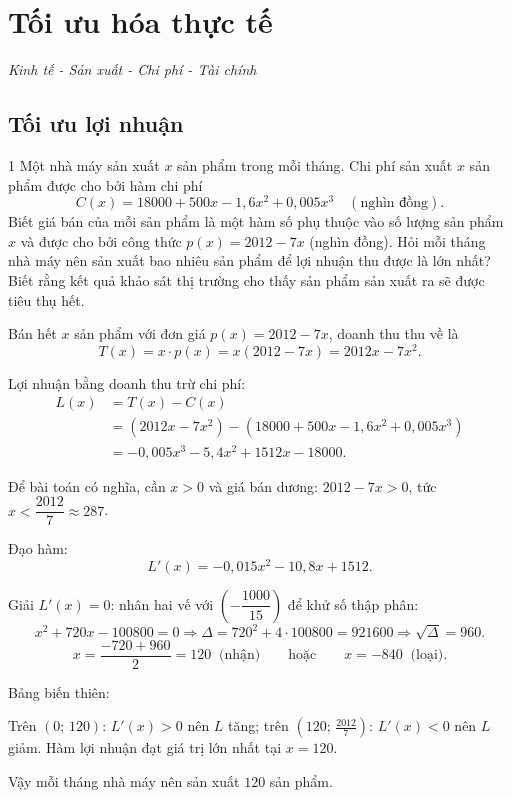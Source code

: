 
\chapter{Tối ưu hóa thực tế}
\begin{center}
  \textit{\color{ForumDarkGray}Kinh tế - Sản xuất - Chi phí - Tài chính}
\end{center}

\section{Tối ưu lợi nhuận}

\begin{baitoan}{1 \hfill {}}
Một nhà máy sản xuất $x$ sản phẩm trong mỗi tháng. Chi phí sản xuất $x$ sản phẩm được cho bởi hàm chi phí
\[ C(x) = 18000 + 500x - 1{,}6x^2 + 0{,}005x^3 \quad (\text{nghìn đồng}). \]
Biết giá bán của mỗi sản phẩm là một hàm số phụ thuộc vào số lượng sản phẩm $x$ và được cho bởi công thức $p(x) = 2012 - 7x$ (nghìn đồng). Hỏi mỗi tháng nhà máy nên sản xuất bao nhiêu sản phẩm để lợi nhuận thu được là lớn nhất? Biết rằng kết quả khảo sát thị trường cho thấy sản phẩm sản xuất ra sẽ được tiêu thụ hết.
\end{baitoan}

\begin{loigiai}
Bán hết $x$ sản phẩm với đơn giá $p(x) = 2012 - 7x$, doanh thu thu về là
\[ T(x) = x \cdot p(x) = x(2012 - 7x) = 2012x - 7x^2. \]

Lợi nhuận bằng doanh thu trừ chi phí:
\begin{align*}
L(x) &= T(x) - C(x) \\
      &= (2012x - 7x^2) - (18000 + 500x - 1{,}6x^2 + 0{,}005x^3) \\
      &= -0{,}005x^3 - 5{,}4x^2 + 1512x - 18000.
\end{align*}

Để bài toán có nghĩa, cần $x > 0$ và giá bán dương: $2012 - 7x > 0$, tức $x < \dfrac{2012}{7} \approx 287$.

Đạo hàm:
\[ L'(x) = -0{,}015x^2 - 10{,}8x + 1512. \]

Giải $L'(x) = 0$: nhân hai vế với $\left(-\dfrac{1000}{15}\right)$ để khử số thập phân:
\[ x^2 + 720x - 100800 = 0 \Rightarrow \Delta = 720^2 + 4 \cdot 100800 = 921600 \Rightarrow \sqrt{\Delta} = 960. \]
\[ x = \frac{-720 + 960}{2} = 120 \;\;\text{(nhận)} \qquad \text{hoặc} \qquad x = -840 \;\;\text{(loại)}. \]

Bảng biến thiên:


Trên $(0;\,120)$: $L'(x) > 0$ nên $L$ tăng; trên $\left(120;\,\frac{2012}{7}\right)$: $L'(x) < 0$ nên $L$ giảm. Hàm lợi nhuận đạt giá trị lớn nhất tại $x = 120$.

Vậy mỗi tháng nhà máy nên sản xuất $\boxed{120}$ sản phẩm.
\end{loigiai}

